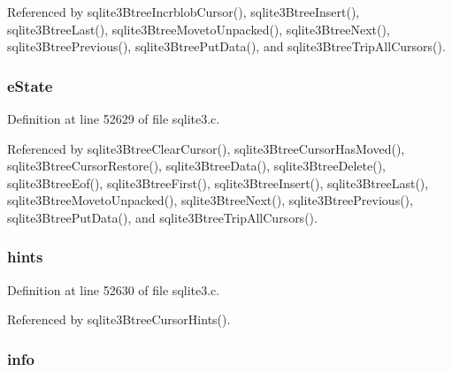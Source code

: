 Referenced by sqlite3\+Btree\+Incrblob\+Cursor(), sqlite3\+Btree\+Insert(), sqlite3\+Btree\+Last(), sqlite3\+Btree\+Moveto\+Unpacked(), sqlite3\+Btree\+Next(), sqlite3\+Btree\+Previous(), sqlite3\+Btree\+Put\+Data(), and sqlite3\+Btree\+Trip\+All\+Cursors().

\hypertarget{struct_bt_cursor_ae5babd54e329060ed9f926ca6df3ab4d}{}
\subsubsection[{e\+State}]{ e\+State}\label{struct_bt_cursor_ae5babd54e329060ed9f926ca6df3ab4d}


Definition at line 52629 of file sqlite3.\+c.



Referenced by sqlite3\+Btree\+Clear\+Cursor(), sqlite3\+Btree\+Cursor\+Has\+Moved(), sqlite3\+Btree\+Cursor\+Restore(), sqlite3\+Btree\+Data(), sqlite3\+Btree\+Delete(), sqlite3\+Btree\+Eof(), sqlite3\+Btree\+First(), sqlite3\+Btree\+Insert(), sqlite3\+Btree\+Last(), sqlite3\+Btree\+Moveto\+Unpacked(), sqlite3\+Btree\+Next(), sqlite3\+Btree\+Previous(), sqlite3\+Btree\+Put\+Data(), and sqlite3\+Btree\+Trip\+All\+Cursors().

\hypertarget{struct_bt_cursor_a6d76178ed694d71107fbae62d6fa9c38}{}
\subsubsection[{hints}]{ hints}\label{struct_bt_cursor_a6d76178ed694d71107fbae62d6fa9c38}


Definition at line 52630 of file sqlite3.\+c.



Referenced by sqlite3\+Btree\+Cursor\+Hints().

\hypertarget{struct_bt_cursor_ab84854bed31add78eccfc236e2d3895e}{}
\subsubsection[{info}]{ info}\label{struct_bt_cursor_ab84854bed31add78eccfc236e2d3895e}


